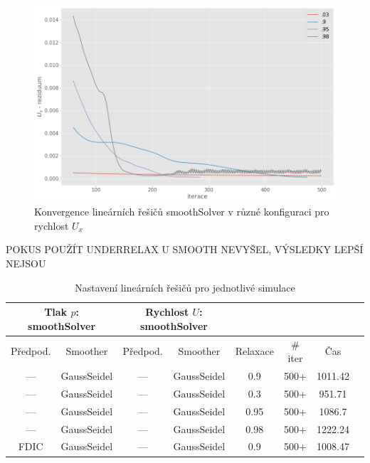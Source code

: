 \documentclass[a4paper,12pt]{report}
\theoremstyle{remark}
\begin{document}
\begin{figure}[H]
	\centering
	\includegraphics[width=1\linewidth]{ux-under-relax.png}
	\caption{Konvergence lineárních řešičů smoothSolver v různé konfiguraci pro rychlost $U_x$}
	\label{fig:ux-residuum-relax}
\end{figure}

POKUS POUŽÍT UNDERRELAX U SMOOTH NEVYŠEL, VÝSLEDKY LEPŠÍ NEJSOU

\begin{table}[H]
	\centering
	\caption{Nastavení lineárních řešičů pro jednotlivé simulace}
	\renewcommand{\arraystretch}{1.9}
	\begin{tabular}{*8c}
		\toprule
		\multicolumn{2}{c}{Tlak $p$: \textbf{smoothSolver}} & \multicolumn{2}{c}{Rychlost $U$: \textbf{smoothSolver}}\\
		\midrule
		Předpod.&Smoother&Předpod.&Smoother&Relaxace& \# iter&Čas\\
		\midrule
		--- & GaussSeidel &   --- & GaussSeidel &0.9&500+&1011.42\\
		--- & GaussSeidel &  --- & GaussSeidel &0.3&500+&951.71\\
		--- & GaussSeidel &   --- & GaussSeidel &0.95&500+&1086.7\\
		--- & GaussSeidel &  --- & GaussSeidel &0.98&500+&1222.24\\
		FDIC & GaussSeidel &  --- & GaussSeidel &0.9&500+&1008.47\\
		\bottomrule
	\end{tabular}
	
	\label{table:solvers_set3}
\end{table}
\end{document}
